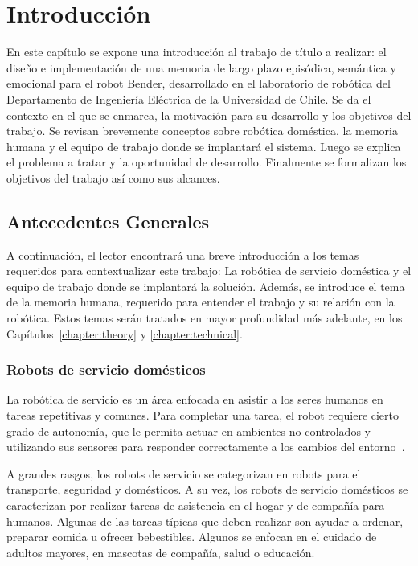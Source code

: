 \chapter{Introducción}\label{chapter:introduction}


En este capítulo se expone una introducción al trabajo de título a realizar: el diseño e implementación de una memoria de largo plazo episódica, semántica y emocional para el robot Bender, desarrollado en el laboratorio de robótica del Departamento de Ingeniería Eléctrica de la Universidad de Chile. Se da el contexto en el que se enmarca, la motivación para su desarrollo y los objetivos del trabajo. Se revisan brevemente conceptos sobre robótica doméstica, la memoria humana y el equipo de trabajo donde se implantará el sistema. Luego se explica el problema a tratar y la oportunidad de desarrollo. Finalmente se formalizan los objetivos del trabajo así como sus alcances.


\section{Antecedentes Generales}

A continuación, el lector encontrará una breve introducción a los temas requeridos para contextualizar este trabajo: La robótica de servicio doméstica y el equipo de trabajo donde se implantará la solución. Además, se introduce el tema de la memoria humana, requerido para entender el trabajo y su relación con la robótica. Estos temas serán tratados en mayor profundidad más adelante, en los Capítulos~\ref{chapter:theory} y \ref{chapter:technical}.


\subsection{Robots de servicio domésticos}

La robótica de servicio es un área enfocada en asistir a los seres humanos en tareas repetitivas y comunes. Para completar una tarea, el robot requiere cierto grado de autonomía, que le permita actuar en ambientes no controlados y utilizando sus sensores para responder correctamente a los cambios del entorno~\cite{IFR}.

A grandes rasgos, los robots de servicio se categorizan en robots para el transporte, seguridad y domésticos. A su vez, los robots de servicio domésticos se caracterizan por realizar tareas de asistencia en el hogar y de compañía para humanos. Algunas de las tareas típicas que deben realizar son ayudar a ordenar, preparar comida u ofrecer bebestibles. Algunos se enfocan en el cuidado de adultos mayores, en mascotas de compañía, salud o educación.

